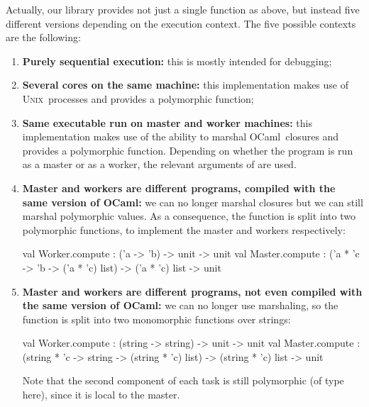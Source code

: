\documentclass[a4paper,12pt]{article}
\newcommand{\Ocaml}{OCaml}
\newcommand{\unix}{\textsc{Unix}}
\begin{document}
Actually, our library provides not just a single 
function as above, but instead five different versions
depending on the execution context. 
The five possible contexts are the following: 
\begin{enumerate}
\item \textbf{Purely sequential execution:}
  this is mostly intended for debugging;

\item \textbf{Several cores on the same machine:} 
  this implementation makes use of \unix\ processes and 
  provides a polymorphic  function;

\item \textbf{Same executable run on master and worker machines:}
  this implementation makes use of the ability to marshal \Ocaml\
  closures and  provides a polymorphic 
  function.
  Depending on whether the program is run as a master or as a worker,
  the relevant arguments of \ocaml{compute} are used.


\item \textbf{Master and workers are different programs, compiled with
    the same version of \Ocaml:} 
  we can no longer marshal closures but we can still
  marshal polymorphic values. As a consequence, 
  the  function is split into two
  polymorphic functions, to implement the master and workers 
  respectively:%
\vspace{-1em}
\begin{ocaml}
val Worker.compute : ('a -> 'b) -> unit -> unit
val Master.compute : 
  ('a * 'c -> 'b -> ('a * 'c) list) -> 
  ('a * 'c) list -> unit
\end{ocaml}

\item \textbf{Master and workers are different programs, not even
    compiled with the same version of \Ocaml:} we can no
  longer use marshaling, so the
   function is split into two monomorphic functions
  over strings:%
\vspace{-1em}
\begin{ocaml}
val Worker.compute : (string -> string) -> unit -> unit
val Master.compute : 
  (string * 'c -> string -> (string * 'c) list) -> 
  (string * 'c) list -> unit
\end{ocaml}
  Note that the second component of each task is still polymorphic (of
  type \ocaml{'c} here), since it is local to the master.
\end{enumerate}
\end{document}

